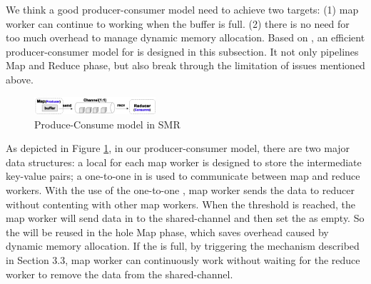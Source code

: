 We think a good producer-consumer model need to achieve two targets:
(1) map worker can continue to working when the buffer is full.
(2) there is no need for too much overhead to manage dynamic memory allocation.
Based on \myth, an efficient producer-consumer model for \myds is designed in this subsection.
It not only pipelines Map and Reduce phase, but also break through the limitation of issues  mentioned above. 

\begin{figure}[!h!t]  
	\centering
	\includegraphics[width=0.4\textwidth]{eps/dmr_channel.eps}
	\caption{Produce-Consume model in SMR}
	\label{fig:dmr:channel}
\end{figure}

As depicted in Figure \ref{fig:dmr:channel}, in our producer-consumer model, there are two major data structures:
a local  for each map worker is designed to store the intermediate key-value pairs; 
a one-to-one  in \myth is used to communicate between map and reduce workers.
With the use of the one-to-one , map worker sends the data to reducer without contenting with other map workers.
When the  threshold is reached,
the map worker will send data in  to the shared-channel and then set the  as empty.
So the  will be reused in the hole Map phase, which saves overhead caused by dynamic memory allocation.
If the  is full,  by triggering the  mechanism described in Section 3.3, map worker can continuously work without waiting for the reduce worker to remove the data from the shared-channel.


